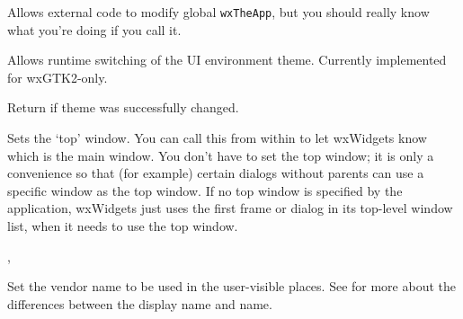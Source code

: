 
Allows external code to modify global \texttt{wxTheApp}, but you should really
know what you're doing if you call it.






\label{wxappsetnativetheme}


Allows runtime switching of the UI environment theme. Currently implemented for wxGTK2-only.

Return \true if theme was successfully changed.




\label{wxappsettopwindow}


Sets the `top' window. You can call this from within  to
let wxWidgets know which is the main window. You don't have to set the top window;
it is only a convenience so that (for example) certain dialogs without parents can use a
specific window as the top window. If no top window is specified by the application,
wxWidgets just uses the first frame or dialog in its top-level window list, when it
needs to use the top window.




, 


\label{wxappsetvendordisplayname}


Set the vendor name to be used in the user-visible places. See
 for more about
the differences between the display name and name.


